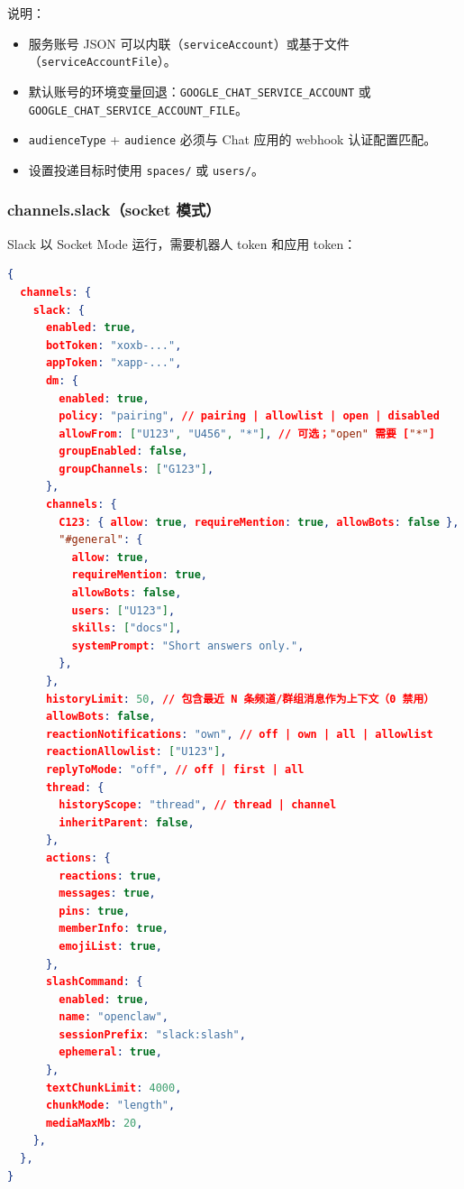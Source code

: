说明：

\begin{itemize}
  \item 服务账号 JSON 可以内联（\texttt{serviceAccount}）或基于文件（\texttt{serviceAccountFile}）。
  \item 默认账号的环境变量回退：\texttt{GOOGLE\_CHAT\_SERVICE\_ACCOUNT} 或 \texttt{GOOGLE\_CHAT\_SERVICE\_ACCOUNT\_FILE}。
  \item \texttt{audienceType} + \texttt{audience} 必须与 Chat 应用的 webhook 认证配置匹配。
  \item 设置投递目标时使用 \texttt{spaces/} 或 \texttt{users/}。
\end{itemize}


\subsubsection{channels.slack（socket 模式）}


Slack 以 Socket Mode 运行，需要机器人 token 和应用 token：

\begin{lstlisting}[language=json]
{
  channels: {
    slack: {
      enabled: true,
      botToken: "xoxb-...",
      appToken: "xapp-...",
      dm: {
        enabled: true,
        policy: "pairing", // pairing | allowlist | open | disabled
        allowFrom: ["U123", "U456", "*"], // 可选；"open" 需要 ["*"]
        groupEnabled: false,
        groupChannels: ["G123"],
      },
      channels: {
        C123: { allow: true, requireMention: true, allowBots: false },
        "#general": {
          allow: true,
          requireMention: true,
          allowBots: false,
          users: ["U123"],
          skills: ["docs"],
          systemPrompt: "Short answers only.",
        },
      },
      historyLimit: 50, // 包含最近 N 条频道/群组消息作为上下文（0 禁用）
      allowBots: false,
      reactionNotifications: "own", // off | own | all | allowlist
      reactionAllowlist: ["U123"],
      replyToMode: "off", // off | first | all
      thread: {
        historyScope: "thread", // thread | channel
        inheritParent: false,
      },
      actions: {
        reactions: true,
        messages: true,
        pins: true,
        memberInfo: true,
        emojiList: true,
      },
      slashCommand: {
        enabled: true,
        name: "openclaw",
        sessionPrefix: "slack:slash",
        ephemeral: true,
      },
      textChunkLimit: 4000,
      chunkMode: "length",
      mediaMaxMb: 20,
    },
  },
}
\end{lstlisting}


